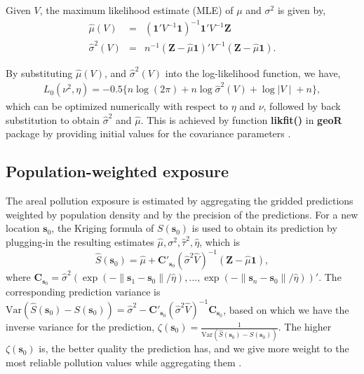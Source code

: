 \documentclass[12,]{article}
\begin{document}
Given \(V\), the maximum likelihood estimate (MLE) of \(\mu\) and
\(\sigma^2\) is given by, \begin{eqnarray}
\hat{\mu} (V) &=& (\symbf{1}\prime V^{-1}\symbf{1})^{-1}\symbf{1}\prime V^{-1}\symbf{Z}\\\nonumber
\hat{\sigma}^2(V) &=& n^{-1}(\symbf{Z}- \hat{\mu}\symbf{1})\prime V^{-1} (\symbf{Z} - \hat{\mu}\symbf{1}).
\label{eq:gle}
\end{eqnarray}

By substituting \(\hat{\mu} (V)\), and \(\hat{\sigma}^2 (V)\) into the
log-likelihood function, we have, \begin{eqnarray}
L_0(\nu^2,\eta) = -0.5\{n\log(2\pi)+n\log \hat{\sigma}^2(V) + \log{\mid V\mid}+n\},
\label{eq:likelihood0}
\end{eqnarray} which can be optimized numerically with respect to
\(\eta\) and \(\nu\), followed by back substitution to obtain
\(\hat{\sigma}^2\) and \(\hat{\mu}\). This is achieved by function
\textbf{likfit()} in \textbf{geoR} package by providing initial values
for the covariance parameters \autocite{Diggle2007}.

\hypertarget{sec:weightedexposure}{%
\subsection{Population-weighted exposure}\label{sec:weightedexposure}}

The areal pollution exposure is estimated by aggregating the gridded
predictions weighted by population density and by the precision of the
predictions. For a new location \(\symbf{s}_0\), the Kriging formula of
\(S(\symbf{s}_0)\) \autocite{Diggle2007} is used to obtain its
prediction by plugging-in the resulting estimates
\(\hat{\mu}, \sigma^2, \hat{\tau}^2, \hat{\eta}\), which is
\begin{equation}
\hat{S}(\symbf{s}_0) = \hat{\mu}+ \symbf{C}\prime_{\symbf{s}_0} (\hat{\sigma}^2 \hat{V})^{-1}(\symbf{Z}-\hat{\mu}\symbf{1}),
\label{eq:prediction}
\end{equation} where
\(\symbf{C}_{\symbf{s}_0}=\hat{\sigma}^2(\exp(-\|\symbf{s}_1-\symbf{s}_0\|/\hat{\eta}),\dots,\exp(-\|\symbf{s}_n-\symbf{s}_0\|/\hat{\eta}))\prime\).
The corresponding prediction variance is
\(\mbox{Var}(\hat{S}(\symbf{s}_0)-S(\symbf{s}_0))=\hat{\sigma}^2-\symbf{C}\prime_{\symbf{s}_0} (\hat{\sigma}^2 \hat{V})^{-1}\symbf{C}_{\symbf{s}_0}\),
based on which we have the inverse variance for the prediction,
\(\zeta(\symbf{s}_0)=\frac{1}{\mbox{Var}(\hat{S}(\symbf{s}_0)-S(\symbf{s}_0))}\).
The higher \(\zeta(\symbf{s}_0)\) is, the better quality the prediction
has, and we give more weight to the most reliable pollution values while
aggregating them \autocite[see][]{SanchezMeca1998}.
\end{document}
